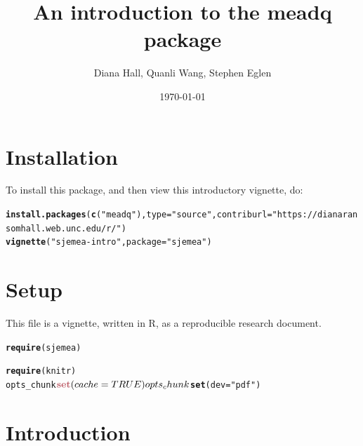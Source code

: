 \documentclass{article}\usepackage[]{graphicx}\usepackage[]{color}
\makeatletter
\newcommand{\hlstr}[1]{\textcolor[rgb]{0.192,0.494,0.8}{#1}}%
\newcommand{\hlkwd}[1]{\textcolor[rgb]{0.737,0.353,0.396}{\textbf{#1}}}%
\newenvironment{kframe}{%
 \def\at@end@of@kframe{}%
 \ifinner\ifhmode%
  \def\at@end@of@kframe{\end{minipage}}%
  \begin{minipage}{\columnwidth}%
 \fi\fi%
 \def\FrameCommand##1{\hskip\@totalleftmargin \hskip-\fboxsep
 \colorbox{shadecolor}{##1}\hskip-\fboxsep
     \hskip-\linewidth \hskip-\@totalleftmargin \hskip\columnwidth}%
 \MakeFramed {\advance\hsize-\width
   \@totalleftmargin\z@ \linewidth\hsize
   \@setminipage}}%
 {\par\unskip\endMakeFramed%
 \at@end@of@kframe}
\newenvironment{knitrout}{}{} %
\makeatother
\begin{document}
\onehalfspacing
\title{An introduction to the meadq package}

\author{Diana Hall, Quanli Wang, Stephen Eglen}
\date{\today}

\maketitle


\section*{Installation}
To install this package, and then view this introductory vignette, do:

\begin{knitrout}
\color{fgcolor}\begin{kframe}
\begin{alltt}
\hlkwd{install.packages}(\hlkwd{c}(\hlstr{"meadq"}), type = \hlstr{"source"}, contriburl = \hlstr{"https://dianaransomhall.web.unc.edu/r/"})
\hlkwd{vignette}(\hlstr{"sjemea-intro"}, package = \hlstr{"sjemea"})
\end{alltt}
\end{kframe}
\end{knitrout}


\section*{Setup}
This file is a vignette, written in R, as a reproducible research
document.

\begin{knitrout}
\color{fgcolor}\begin{kframe}
\begin{alltt}
\hlkwd{require}(sjemea)
\end{alltt}


{\ttfamily\noindent\color{warningcolor}{\#\# Warning: package 'sjemea' was built under R version 3.0.3}}\begin{alltt}
\hlkwd{require}(knitr)
opts_chunk$\hlkwd{set}(cache = TRUE)
opts_chunk$\hlkwd{set}(dev = \hlstr{"pdf"})
\end{alltt}
\end{kframe}
\end{knitrout}


\section*{Introduction}
\end{document}
